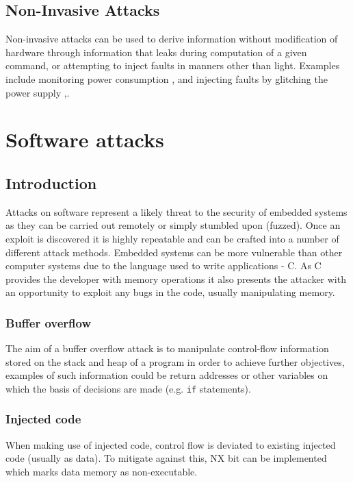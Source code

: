 \subsection{Non-Invasive Attacks}
Non-invasive attacks can be used to derive information without modification of hardware through information that leaks during computation of a given command, or attempting to inject faults in manners other than light. Examples include monitoring power consumption \cite{Maurer1999},\cite{MangardStefan2007Paa:} and injecting faults by glitching the power supply \cite{Anderson1996},\cite{Bar-el2006}.

\section{Software attacks}

\subsection{Introduction}

Attacks on software represent a likely threat to the security of embedded systems as they can be carried out remotely or simply stumbled upon (fuzzed). Once an exploit is discovered it is highly repeatable and can be crafted into a number of different attack methods. Embedded systems can be more vulnerable than other computer systems due to the language used to write applications - C. As C provides the developer with memory operations it also presents the attacker with an opportunity to exploit any bugs in the code, usually manipulating memory.

\subsubsection{Buffer overflow}

The aim of a buffer overflow attack is to manipulate control-flow information stored on the stack and heap of a program in order to achieve further objectives, examples of such information could be return addresses or other variables on which the basis of decisions are made (e.g. \verb|if| statements).

\subsubsection{Injected code}

When making use of injected code, control flow is deviated to existing injected code (usually as data). To mitigate against this, NX bit can be implemented which marks data memory as non-executable.

